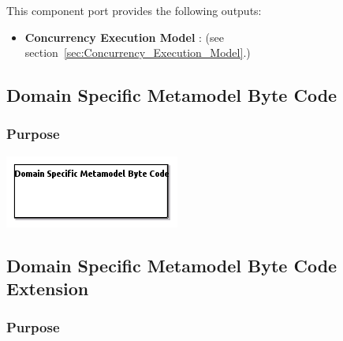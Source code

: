 \documentclass{gemoc} %
\begin{document}
This component port provides the following outputs:
\begin{itemize}
  \item \textbf{Concurrency Execution Model} :
(see section~\ref{sec:Concurrency_Execution_Model}.)
\end{itemize}


\subsection{Domain Specific Metamodel Byte Code}
\label{sec:Domain_Specific_Metamodel_Byte_Code}


\subsubsection{Purpose}


\begin{center}
\includegraphics*[trim=0.0cm 0.0cm 0cm 0.0cm, clip=true]{../images/generated/Generated_Domain_Specific_Metamodel_Byte_Code.png}
\end{center}




\subsection{Domain Specific Metamodel Byte Code Extension}
\label{sec:Domain_Specific_Metamodel_Byte_Code_Extension}


\subsubsection{Purpose}
\end{document}
